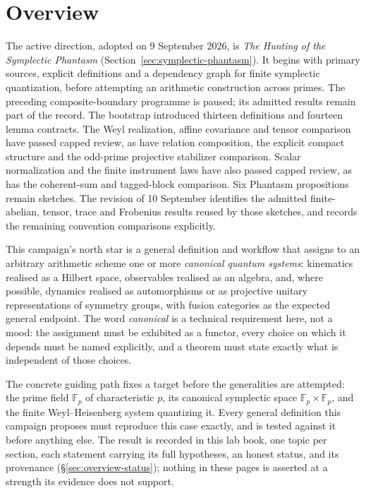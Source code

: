 \section{Overview}
\label{sec:overview}

The active direction, adopted on 9 September 2026, is
\emph{The Hunting of the Symplectic Phantasm}
(Section~\ref{sec:symplectic-phantasm}). It begins with primary sources,
explicit definitions and a dependency graph for finite symplectic
quantization, before attempting an arithmetic construction across primes.
The preceding composite-boundary programme is paused; its admitted results
remain part of the record. The bootstrap introduced thirteen definitions
and fourteen lemma contracts. The Weyl realization, affine covariance and
tensor comparison have passed capped review, as have relation composition,
the explicit compact structure and the odd-prime projective stabilizer
comparison. Scalar normalization and the finite instrument laws have also
passed capped review, as has the coherent-sum and tagged-block comparison.
Six Phantasm propositions remain sketches.
The revision of 10 September identifies the admitted finite-abelian,
tensor, trace and Frobenius results reused by those sketches, and records
the remaining convention comparisons explicitly.

This campaign's north star is a general definition and workflow that assigns
to an arbitrary arithmetic scheme one or more \emph{canonical quantum
systems}: kinematics realised as a Hilbert space, observables realised as an
algebra, and, where possible, dynamics realised as automorphisms or as
projective unitary representations of symmetry groups, with fusion
categories as the expected general endpoint. The word \emph{canonical} is a
technical requirement here, not a mood: the assignment must be exhibited as a
functor, every choice on which it depends must be named explicitly, and a
theorem must state exactly what is independent of those choices.

The concrete guiding path fixes a target before the generalities are
attempted: the prime field $\mathbb{F}_p$ of characteristic $p$, its
canonical symplectic space $\mathbb{F}_p \times \mathbb{F}_p$, and the finite
Weyl--Heisenberg system quantizing it. Every general definition this campaign
proposes must reproduce this case exactly, and is tested against it before
anything else. The result is recorded in this lab book, one topic per
section, each statement carrying its full hypotheses, an honest status, and
its provenance (\S\ref{sec:overview-status}); nothing in these pages is
asserted at a strength its evidence does not support.


